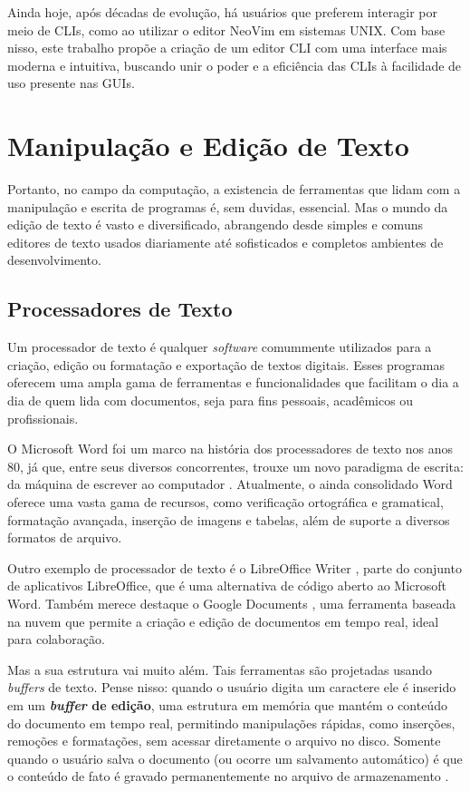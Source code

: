 Ainda hoje, após décadas de evolução, há usuários que preferem interagir por meio
de CLIs, como ao utilizar o editor NeoVim em sistemas UNIX. Com base nisso, este
trabalho propõe a criação de um editor CLI com uma interface mais moderna e
intuitiva, buscando unir o poder e a eficiência das CLIs à facilidade de uso presente
nas GUIs.

\section{Manipulação e Edição de Texto}

Portanto, no campo da computação, a existencia de ferramentas que lidam com a
manipulação e escrita de programas é, sem duvidas, essencial. Mas o mundo da edição
de texto é vasto e diversificado, abrangendo desde simples e comuns editores de
texto usados diariamente até sofisticados e completos ambientes de
desenvolvimento.

\subsection{Processadores de Texto}

Um processador de texto é qualquer \textit{software} comummente utilizados
para a criação, edição ou formatação e exportação de textos digitais.
Esses programas oferecem uma ampla gama de ferramentas e funcionalidades que
facilitam o dia a dia de quem lida com documentos, seja para fins pessoais,
acadêmicos ou profissionais.

O Microsoft Word \cite{microsoft_word} foi um marco na história dos processadores
de texto nos anos 80, já que, entre seus diversos concorrentes,
trouxe um novo paradigma de escrita: da máquina de escrever ao computador
\cite{inbook}. Atualmente, o ainda consolidado Word oferece uma vasta gama de
recursos, como verificação ortográfica e gramatical, formatação avançada,
inserção de imagens e tabelas, além de suporte a diversos formatos de arquivo.

Outro exemplo de processador de texto é o LibreOffice Writer \cite{libreoffice}, parte do
conjunto de aplicativos LibreOffice, que é uma alternativa de código aberto
ao Microsoft Word. Também merece destaque o Google Documents \cite{google_docs}, uma ferramenta
baseada na nuvem que permite a criação e edição de documentos em tempo real,
ideal para colaboração.

Mas a sua estrutura vai muito além. Tais ferramentas são projetadas usando
\textit{buffers} de texto. Pense nisso: quando o usuário digita um caractere
ele é inserido em um \textbf{\textit{buffer} de edição}, uma estrutura em memória
que mantém o conteúdo do documento em tempo real, permitindo manipulações rápidas,
como inserções, remoções e formatações, sem acessar diretamente o arquivo no disco.
Somente quando o usuário salva o documento (ou ocorre um salvamento automático) é que
o conteúdo de fato é gravado permanentemente no arquivo de armazenamento \cite{Jacobson1989}.

